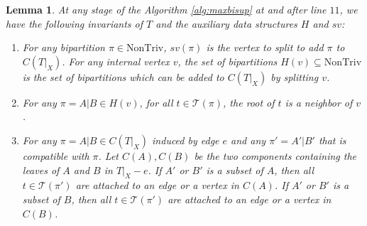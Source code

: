 \documentclass{bmcart}
\newcommand{\ntriv}{\mathrm{NonTriv}}
\newtheorem{lemma}{Lemma}
\begin{document}
\begin{lemma}\label{lem:invariants}
    At any stage of the Algorithm \ref{alg:maxbisup} at and after line $11$, we have the following invariants of $T$ and the auxiliary data structures $H$ and $sv$:
        \begin{enumerate}
        \item For any bipartition $\pi \in \ntriv $, $sv(\pi)$ is the vertex to split to add $\pi$ to $C(T|_X)$. For any internal vertex $v$, the set of bipartitions $H(v) \subseteq \ntriv $ is the set of bipartitions which can be added to $C(T|_X)$ by splitting $v$. 
        
        \item For any $\pi = A|B \in H(v)$, for all $t \in \mathcal{T}(\pi)$, the root of $t$ is a neighbor of $v$.
        
        \item For any $\pi = A|B \in C(T|_X)$ induced by edge $e$ and any $\pi' = A'|B'$ that is compatible with $\pi$. Let $C(A), C(B)$ be the two components containing the leaves of $A$ and $B$ in $T|_X - e$. If $A'$ or $B'$ is a subset of $A$, then all $t \in \mathcal{T}(\pi')$ are attached to an edge or a vertex in $C(A)$. If $A'$ or $B'$ is a subset of $B$, then all $t \in \mathcal{T}(\pi')$ are attached to an edge or a vertex in $C(B)$. 
    \end{enumerate}
\end{lemma}
\end{document}
